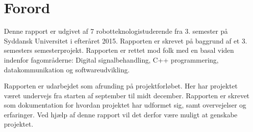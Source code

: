 \section*{Forord}
Denne rapport er udgivet af 7 robotteknologistuderende fra 3. semester på Syddansk Universitet i efteråret 2015. Rapporten er skrevet på baggrund af et 3. semesters semesterprojekt. 
Rapporten er rettet mod folk med en basal viden indenfor fagområderne: Digital signalbehandling, C++ programmering, datakommunikation og softwareudvikling.

Rapporten er udarbejdet som afrunding på projektforløbet. Her har projektet været undervejs fra starten af september til midt december. Rapporten er skrevet som dokumentation for hvordan projektet har udformet sig, samt overvejelser og erfaringer. Ved hjælp af denne rapport vil det derfor være muligt at genskabe projektet. 